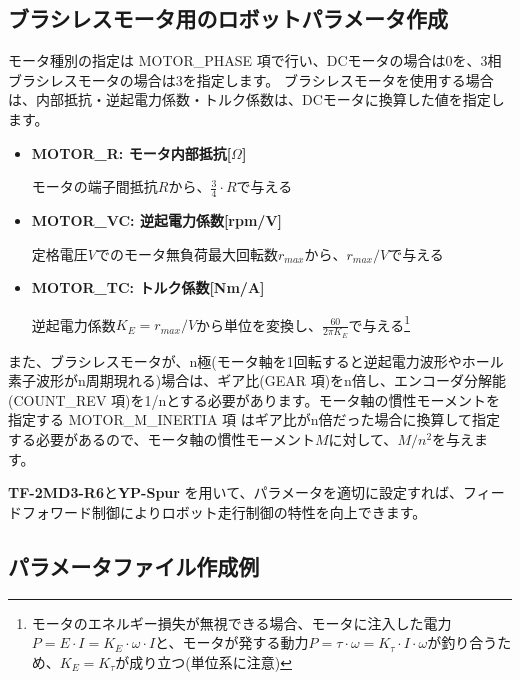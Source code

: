 \documentclass[11pt,a4j,openany]{jbook}
\begin{document}
\subsection{ブラシレスモータ用のロボットパラメータ作成}
\label{sec:パラメータ作成}

モータ種別の指定は MOTOR\_PHASE 項で行い、DCモータの場合は0を、3相ブラシレスモータの場合は3を指定します。
ブラシレスモータを使用する場合は、内部抵抗・逆起電力係数・トルク係数は、DCモータに換算した値を指定します。
\begin{itemize}
\item {\bf MOTOR\_R: モータ内部抵抗[$\Omega$]} \par モータの端子間抵抗$R$から、$\frac{3}{4} \cdot R$で与える
\item {\bf MOTOR\_VC: 逆起電力係数[rpm/V]} \par 定格電圧$V$でのモータ無負荷最大回転数$r_{max}$から、$r_{max}/V$で与える
\item {\bf MOTOR\_TC: トルク係数[Nm/A]} \par 逆起電力係数$K_{E}=r_{max}/V$から単位を変換し、$\frac{60}{2\pi K_{E}}$で与える\footnote{モータのエネルギー損失が無視できる場合、モータに注入した電力$P = E \cdot I = K_{E} \cdot \omega \cdot I$と、モータが発する動力$P = \tau \cdot \omega = K_{\tau} \cdot I \cdot \omega$が釣り合うため、$K_{E} = K_{\tau}$が成り立つ(単位系に注意)}
\end{itemize}\par

また、ブラシレスモータが、n極(モータ軸を1回転すると逆起電力波形やホール素子波形がn周期現れる)場合は、ギア比(GEAR 項)をn倍し、エンコーダ分解能(COUNT\_REV 項)を1/nとする必要があります。モータ軸の慣性モーメントを指定する MOTOR\_M\_INERTIA 項 はギア比がn倍だった場合に換算して指定する必要があるので、モータ軸の慣性モーメント$M$に対して、$M/n^{2}$を与えます。\par

{\bf TF-2MD3-R6}と{\bf YP-Spur} を用いて、パラメータを適切に設定すれば、フィードフォワード制御によりロボット走行制御の特性を向上できます。\par


\subsection{パラメータファイル作成例}
\label{sec:パラメータ作成例}
\end{document}

